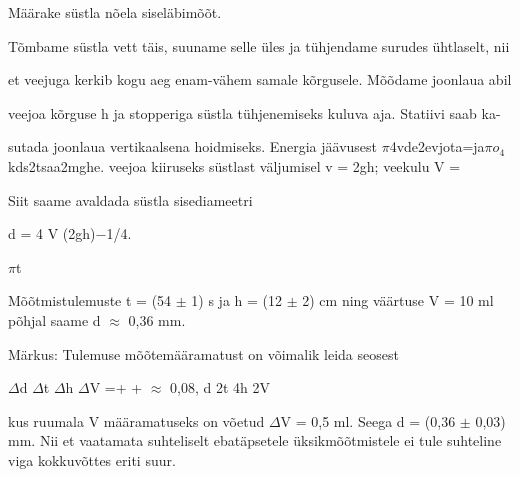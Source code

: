 
Määrake süstla nõela siseläbimõõt.

\hint

\solu
Tõmbame süstla vett täis, suuname selle üles ja tühjendame surudes ühtlaselt, nii

et veejuga kerkib kogu aeg enam-vähem samale kõrgusele. Mõõdame joonlaua abil

veejoa kõrguse h ja stopperiga süstla tühjenemiseks kuluva aja. Statiivi saab ka-

sutada joonlaua vertikaalsena hoidmiseks. Energia jäävusest $\pi$4vde2evjota=ja$\pi$$o_4$ kds2tsaa2mghe. veejoa kiiruseks süstlast väljumisel v = 2gh; veekulu V =

Siit saame avaldada süstla sisediameetri

d = 4 V (2gh)$-$1/4.

$\pi$t

Mõõtmistulemuste t = (54 $\pm$ 1) s ja h = (12 $\pm$ 2) cm ning väärtuse V = 10 ml põhjal saame d $\approx$ 0,36 mm.

Märkus: Tulemuse mõõtemääramatust on võimalik leida seosest

$\Delta$d $\Delta$t $\Delta$h $\Delta$V =+ + $\approx$ 0,08, d 2t 4h 2V

kus ruumala V määramatuseks on võetud $\Delta$V = 0,5 ml. Seega d = (0,36 $\pm$ 0,03) mm. Nii et vaatamata suhteliselt ebatäpsetele üksikmõõtmistele ei tule suhteline viga kokkuvõttes eriti suur.
\probend
